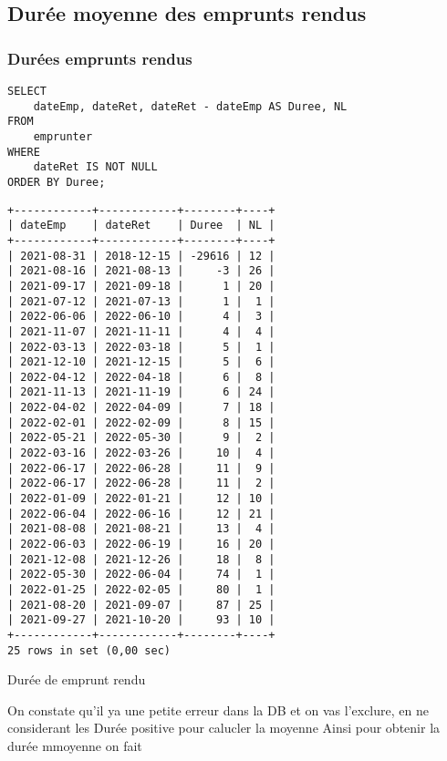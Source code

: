 \documentclass{article}
\begin{document}
\subsection{Durée moyenne des emprunts rendus}
\subsubsection{Durées emprunts rendus}
\begin{center}
\begin{minipage}{0.6\linewidth}
\begin{listing}[H]
\begin{verbatim}
SELECT 
    dateEmp, dateRet, dateRet - dateEmp AS Duree, NL
FROM
    emprunter
WHERE
    dateRet IS NOT NULL
ORDER BY Duree;
\end{verbatim}
\begin{verbatim}
+------------+------------+--------+----+
| dateEmp    | dateRet    | Duree  | NL |
+------------+------------+--------+----+
| 2021-08-31 | 2018-12-15 | -29616 | 12 |
| 2021-08-16 | 2021-08-13 |     -3 | 26 |
| 2021-09-17 | 2021-09-18 |      1 | 20 |
| 2021-07-12 | 2021-07-13 |      1 |  1 |
| 2022-06-06 | 2022-06-10 |      4 |  3 |
| 2021-11-07 | 2021-11-11 |      4 |  4 |
| 2022-03-13 | 2022-03-18 |      5 |  1 |
| 2021-12-10 | 2021-12-15 |      5 |  6 |
| 2022-04-12 | 2022-04-18 |      6 |  8 |
| 2021-11-13 | 2021-11-19 |      6 | 24 |
| 2022-04-02 | 2022-04-09 |      7 | 18 |
| 2022-02-01 | 2022-02-09 |      8 | 15 |
| 2022-05-21 | 2022-05-30 |      9 |  2 |
| 2022-03-16 | 2022-03-26 |     10 |  4 |
| 2022-06-17 | 2022-06-28 |     11 |  9 |
| 2022-06-17 | 2022-06-28 |     11 |  2 |
| 2022-01-09 | 2022-01-21 |     12 | 10 |
| 2022-06-04 | 2022-06-16 |     12 | 21 |
| 2021-08-08 | 2021-08-21 |     13 |  4 |
| 2022-06-03 | 2022-06-19 |     16 | 20 |
| 2021-12-08 | 2021-12-26 |     18 |  8 |
| 2022-05-30 | 2022-06-04 |     74 |  1 |
| 2022-01-25 | 2022-02-05 |     80 |  1 |
| 2021-08-20 | 2021-09-07 |     87 | 25 |
| 2021-09-27 | 2021-10-20 |     93 | 10 |
+------------+------------+--------+----+
25 rows in set (0,00 sec)
\end{verbatim}
\caption{Durée de emprunt rendu}
\end{listing}
\end{minipage}
\end{center}
On constate qu'il ya une petite erreur dans la DB et on vas l'exclure, en ne considerant les Durée positive pour calucler la moyenne
Ainsi pour obtenir la durée mmoyenne on fait
\end{document}
